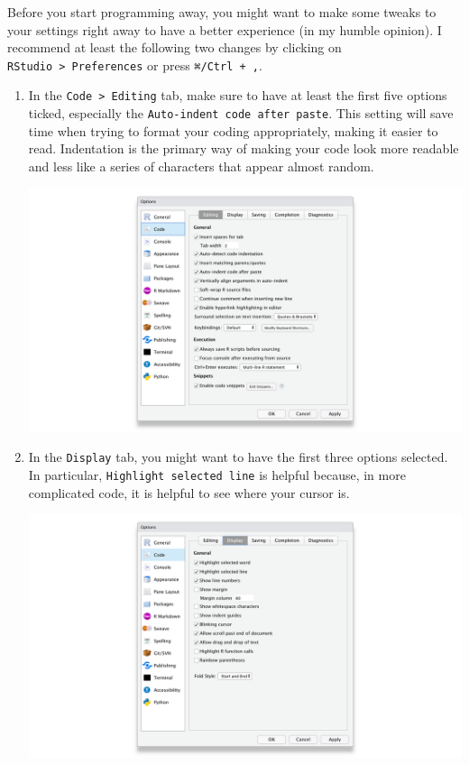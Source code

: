 \documentclass[
]{book}
\begin{document}
Before you start programming away, you might want to make some tweaks to your settings right away to have a better experience (in my humble opinion). I recommend at least the following two changes by clicking on \texttt{RStudio\ \textgreater{}\ Preferences} or press \texttt{⌘/Ctrl\ +\ ,}.

\begin{enumerate}
\def\labelenumi{\arabic{enumi}.}
\item
  In the \texttt{Code\ \textgreater{}\ Editing} tab, make sure to have at least the first five options ticked, especially the \texttt{Auto-indent\ code\ after\ paste}. This setting will save time when trying to format your coding appropriately, making it easier to read. Indentation is the primary way of making your code look more readable and less like a series of characters that appear almost random.

  \includegraphics{images/chapter_03_img/rstudio_preferences/00_rstudio_preferences_editing.png}
\item
  In the \texttt{Display} tab, you might want to have the first three options selected. In particular, \texttt{Highlight\ selected\ line} is helpful because, in more complicated code, it is helpful to see where your cursor is.

  \includegraphics{images/chapter_03_img/rstudio_preferences/01_rstudio_preferences_display.png}
\end{enumerate}
\end{document}
